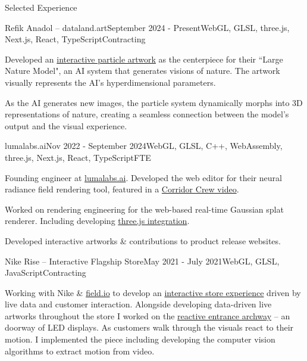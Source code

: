 \documentclass{resume} %
\begin{document}
\begin{rSection}{Selected Experience}

\begin{rSubsection}{Refik Anadol – dataland.art}{September 2024 - Present}{WebGL, GLSL, three.js, Next.js, React, TypeScript}{Contracting}
\item Developed an \href{https://x.com/refikanadol/status/1869051351130382519}{interactive particle artwork} as the centerpiece for their ``Large Nature Model", an AI system that generates visions of nature. The artwork visually represents the AI's hyperdimensional parameters.
\item As the AI generates new images, the particle system dynamically morphs into 3D representations of nature, creating a seamless connection between the model's output and the visual experience.
\end{rSubsection}



\begin{rSubsection}{lumalabs.ai}{Nov 2022 - September 2024}{WebGL, GLSL, C++, WebAssembly, three.js, Next.js, React, TypeScript}{FTE}
\item Founding engineer at \href{https://lumalabs.ai}{lumalabs.ai}. Developed the web editor for their neural radiance field rendering tool, featured in a \href{https://www.youtube.com/watch?v=YX5AoaWrowY}{Corridor Crew video}.
\item Worked on rendering engineering for the web-based real-time Gaussian splat renderer. Including developing \href{https://www.npmjs.com/package/@lumaai/luma-web}{three.js integration}.
\item Developed interactive artworks \& contributions to product release websites.
\end{rSubsection}

\begin{rSubsection}{Nike Rise – Interactive Flagship Store}{May 2021 - July 2021}{WebGL, GLSL, JavaScript}{Contracting}
\item Working with Nike \& \href{https://field.io/work/nike-rise-intelligent-retail-system}{field.io} to develop an \href{https://field.io/work/nike-rise-intelligent-retail-system}{interactive store experience} driven by live data and customer interaction. Alongside developing data-driven live artworks throughout the store I worked on the \href{https://hypebeast.com/2021/8/nike-rise-seoul-retail-concept-store-info}{reactive entrance archway} – an doorway of LED displays. As customers walk through the visuals react to their motion. I implemented the piece including developing the computer vision algorithms to extract motion from video.
\end{rSubsection}


\end{rSection}
\end{document}
